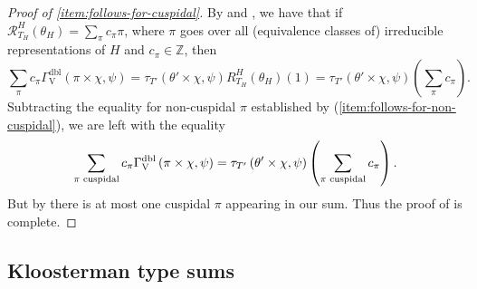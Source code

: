 \documentclass[12pt, reqno]{amsart}
\theoremstyle{definition}
\theoremstyle{definition}
\theoremstyle{definition}
\newcommand{\zIntegers}{\mathbb{Z}}
\newcommand{\hermitianSpace}{\mathrm{V}}
\newcommand{\fieldCharacter}{\psi}
\newcommand{\dblGammaFactorSpace}[4]{\Gamma^{\mathrm{dbl}}_{#1}\left(#2 \times #3, #4\right)}
\newcommand{\GaussSumTorusCharacter}[4]{\tau_{#1}\left(#2 \times #3, #4\right)}
\newcommand{\RTGTheta}[3]{R_{#1}^{#2}(#3)}
\newcommand{\RTThetaVirtual}[3]{\mathcal{R}_{#1}^{#2}(#3)}
\begin{document}
\begin{proof}[Proof of \eqref{item:follows-for-cuspidal}]
By  and , we have that if $\RTThetaVirtual{T_H}{H}{\theta_H} = \sum_{\pi} c_{\pi} \pi$, where $\pi$ goes over all (equivalence classes of) irreducible representations of $H$ and $c_{\pi} \in \zIntegers$, then
$$\sum_{\pi} c_{\pi} \dblGammaFactorSpace{\hermitianSpace}{\pi}{\chi}{\fieldCharacter} = \GaussSumTorusCharacter{T'}{\theta'}{\chi}{\fieldCharacter} \RTGTheta{T_H}{H}{\theta_H}\left(1\right) = \GaussSumTorusCharacter{T'}{\theta'}{\chi}{\fieldCharacter} \left(\sum_{\pi} c_{\pi}\right).$$
Subtracting the equality for non-cuspidal $\pi$ established by (\ref{item:follows-for-non-cuspidal}), we are left with the equality
$$\sum_{\pi \textnormal{ cuspidal}} c_{\pi} \dblGammaFactorSpace{\hermitianSpace}{\pi}{\chi}{\fieldCharacter} = \GaussSumTorusCharacter{T'}{\theta'}{\chi}{\fieldCharacter} \left(\sum_{\pi \textnormal{ cuspidal}} c_{\pi}\right).$$
But by  there is at most one cuspidal $\pi$ appearing in our sum. Thus the proof of  is complete.
\end{proof}

\subsection{Kloosterman type sums}
\end{document}
